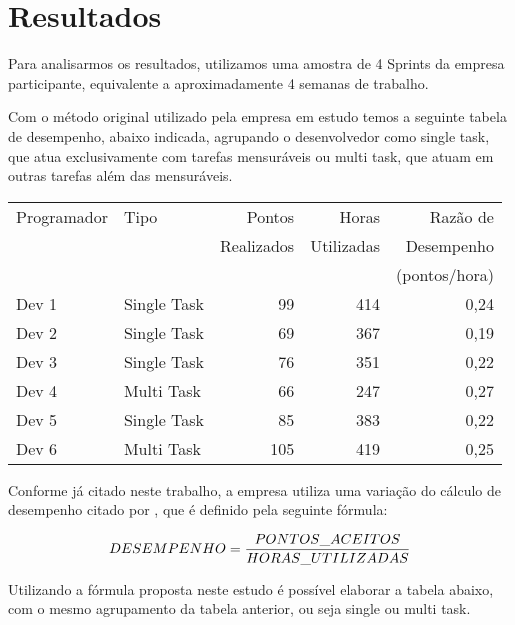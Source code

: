 \section{Resultados}

Para analisarmos os resultados, utilizamos uma amostra de 4 Sprints da empresa participante, equivalente a aproximadamente 4 semanas de trabalho.\par
Com o método original utilizado pela empresa em estudo temos a seguinte tabela de desempenho, abaixo indicada, agrupando o desenvolvedor como single task, que atua exclusivamente com tarefas mensuráveis ou multi task, que atuam em outras tarefas além das mensuráveis.

\begin{center}
\begin{tabular}{ | l | l | r | r | r | } 
 \hline
 Programador & Tipo & Pontos & Horas & Razão de \\ 
 & & Realizados & Utilizadas & Desempenho \\ 
 & & & & (pontos/hora) \\ \hline
 Dev 1 & Single Task & 99  & 414 & 0,24 \\
 Dev 2 & Single Task & 69  & 367 & 0,19 \\
 Dev 3 & Single Task & 76  & 351 & 0,22 \\
 Dev 4 & Multi Task  & 66  & 247 & 0,27 \\
 Dev 5 & Single Task & 85  & 383 & 0,22 \\
 Dev 6 & Multi Task  & 105 & 419 & 0,25 \\
 \hline
\end{tabular}
\end{center}

Conforme já citado neste trabalho, a empresa utiliza uma variação do cálculo de desempenho citado por , que é definido pela seguinte fórmula:\par

\begin{equation}
    DESEMPENHO = { PONTOS\_ACEITOS \over HORAS\_UTILIZADAS }
\end{equation}

Utilizando a fórmula proposta neste estudo é possível elaborar a tabela abaixo, com o mesmo agrupamento da tabela anterior, ou seja single ou multi task.

